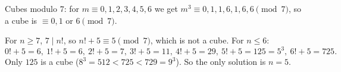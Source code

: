Cubes modulo $7$: for $m\equiv0,1,2,3,4,5,6$ we get $m^3\equiv0,1,1,6,1,6,6\pmod7$, so a cube is $\equiv0,1$ or $6\pmod 7$.

For $n\ge7$, $7\mid n!$, so $n!+5\equiv5\pmod7$, which is not a cube. For $n\le6$:
\[
0!+5=6,\ 1!+5=6,\ 2!+5=7,\ 3!+5=11,\ 4!+5=29,\ 5!+5=125=5^3,\ 6!+5=725 .
\]
Only $125$ is a cube ($8^3=512<725<729=9^3$). So the only solution is $\boxed{n=5}$.
